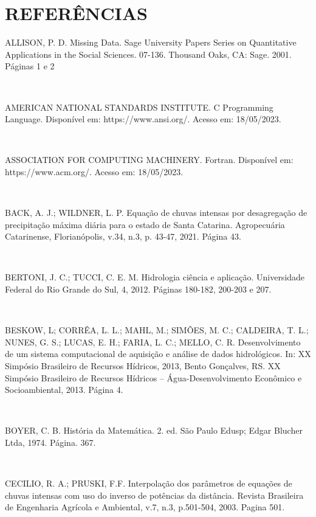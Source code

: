 \chapter{REFERÊNCIAS}

\begin{flushleft}
\singlespacing
ALLISON, P. D. Missing Data. Sage University Papers Series on Quantitative Applications in the Social Sciences. 07-136. Thousand Oaks, CA: Sage. 2001. Páginas 1 e 2

\

AMERICAN NATIONAL STANDARDS INSTITUTE. C Programming Language. Disponível em: https://www.ansi.org/. Acesso em: 18/05/2023.

\

ASSOCIATION FOR COMPUTING  MACHINERY. Fortran. Disponível em: https://www.acm.org/. Acesso em: 18/05/2023.

\

BACK, A. J.; WILDNER, L. P. Equação de chuvas intensas por desagregação de precipitação máxima diária para o estado de Santa Catarina. Agropecuária Catarinense, Florianópolis, v.34, n.3, p. 43-47, 2021. Página 43.

\

BERTONI, J. C.; TUCCI, C. E. M. Hidrologia ciência e aplicação. Universidade Federal do Rio Grande do Sul, 4, 2012. Páginas 180-182,  200-203 e 207.

\

BESKOW, L; CORRÊA, L. L.; MAHL, M.; SIMÕES, M. C.; CALDEIRA, T. L.; NUNES, G. S.; LUCAS, E. H.; FARIA, L. C.; MELLO, C. R. Desenvolvimento de um sistema computacional de aquisição e análise de dados hidrológicos. In: XX Simpósio Brasileiro de Recursos Hídricos, 2013, Bento Gonçalves, RS. XX Simpósio Brasileiro de Recursos Hídricos – Água-Desenvolvimento Econômico e Socioambiental, 2013. Página 4.

\

BOYER, C. B. História da Matemática. 2. ed. São Paulo Edusp; Edgar Blucher Ltda, 1974. Página. 367.

\

CECILIO, R. A.; PRUSKI, F.F. Interpolação dos parâmetros de equações de chuvas intensas com uso do inverso de potências da distância. Revista Brasileira de Engenharia Agrícola e Ambiental, v.7, n.3, p.501-504, 2003. Pagina 501.


\end{flushleft}
